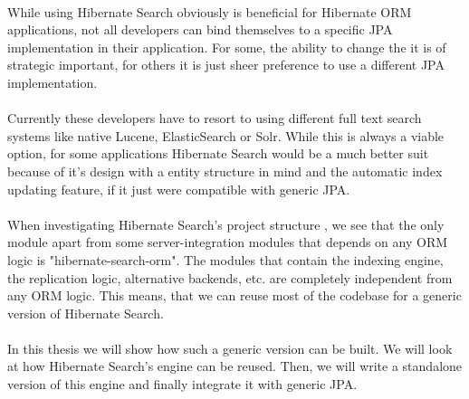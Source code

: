 \\
While using Hibernate Search obviously is beneficial for Hibernate ORM applications, not all developers can bind themselves to a specific JPA implementation in their application. For some, the ability to change the it is of strategic important, for others it is just sheer preference to use a different JPA implementation.
\\\\
Currently these developers have to resort to using different full text search systems like native Lucene, ElasticSearch or Solr. While this is always a viable option, for some applications Hibernate Search would be a much better suit because of it's design with a entity structure in mind and the automatic index updating feature, if it just were compatible with generic JPA.
\\\\
When investigating Hibernate Search's project structure \cite{source-code-git}, we see that the only module apart from some server-integration modules that depends on any ORM logic is "hibernate-search-orm". The modules that contain the indexing engine, the replication logic, alternative backends, etc. are completely independent from any ORM logic. This means, that we can reuse most of the codebase for a generic version of Hibernate Search.
\\\\
In this thesis we will show how such a generic version can be built. We will look at how Hibernate Search's engine can be reused. Then, we will write a standalone version of this engine and finally integrate it with generic JPA.

\pagebreak
